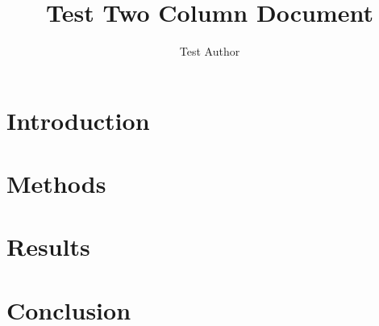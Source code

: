 \documentclass[twocolumn]{article}
\title{Test Two Column Document}
\author{Test Author}
\begin{document}
\maketitle

\section{Introduction}
\lipsum[1-3]

\section{Methods}  
\lipsum[4-6]

\section{Results}
\lipsum[7-9]

\section{Conclusion}
\lipsum[10]
\end{document}
